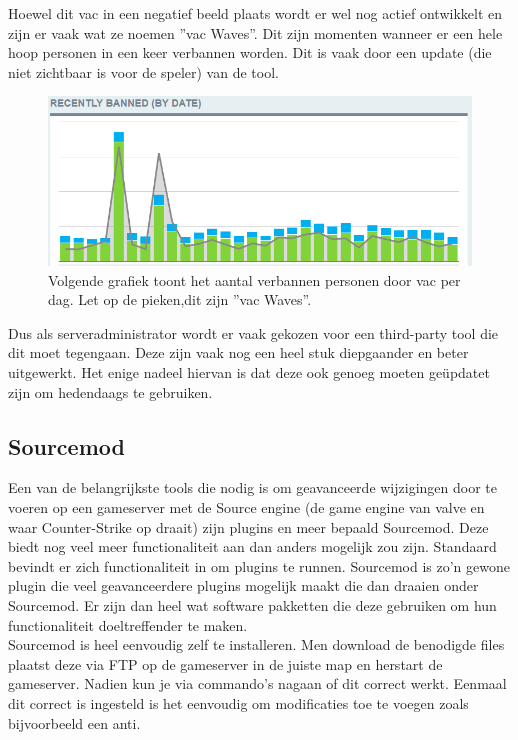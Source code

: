 \documentclass[pdftex,a4paper,12pt,twoside]{report}
\begin{document}
Hoewel dit \gls{vac} in een negatief beeld plaats wordt er wel nog actief ontwikkelt en zijn er vaak wat ze noemen ''\gls{vac} Waves''. Dit zijn momenten wanneer er een hele hoop personen in een keer verbannen worden. Dit is vaak door een update (die niet zichtbaar is voor de speler) van de tool. 
\begin{figure}[H]
\centering
\includegraphics[width=15cm]{img/banwave}
\caption{Volgende grafiek toont het aantal verbannen personen door \gls{vac} per dag. Let op de pieken,dit zijn ''\gls{vac} Waves''. \citep{vacbans} }
\end{figure}

Dus als serveradministrator wordt er vaak gekozen voor een third-party tool die dit moet tegengaan. Deze zijn vaak nog een heel stuk diepgaander en beter uitgewerkt. Het enige nadeel hiervan is dat deze ook genoeg moeten geüpdatet zijn om hedendaags te gebruiken.


\subsection{Sourcemod}
\label{sec:sourcemod}
Een van de belangrijkste tools die nodig is om geavanceerde wijzigingen door te voeren op een gameserver met de Source engine (de game engine van \gls{valve} en waar Counter-Strike op draait) zijn plugins en meer bepaald Sourcemod. Deze biedt nog veel meer functionaliteit aan dan anders mogelijk zou zijn. Standaard bevindt er zich functionaliteit in om plugins te runnen. Sourcemod is zo'n gewone plugin die veel geavanceerdere plugins mogelijk maakt die dan draaien onder Sourcemod. Er zijn dan heel wat software pakketten die deze gebruiken om hun functionaliteit doeltreffender te maken. 
\\

Sourcemod is heel eenvoudig zelf te installeren. Men download de benodigde files plaatst deze via FTP op de gameserver in de juiste \gls{map} en herstart de gameserver. Nadien kun je via commando's nagaan of dit correct werkt. Eenmaal dit correct is ingesteld is het eenvoudig om modificaties toe te voegen zoals bijvoorbeeld een \gls{anti}. \citep{sourcemod}
\end{document}
